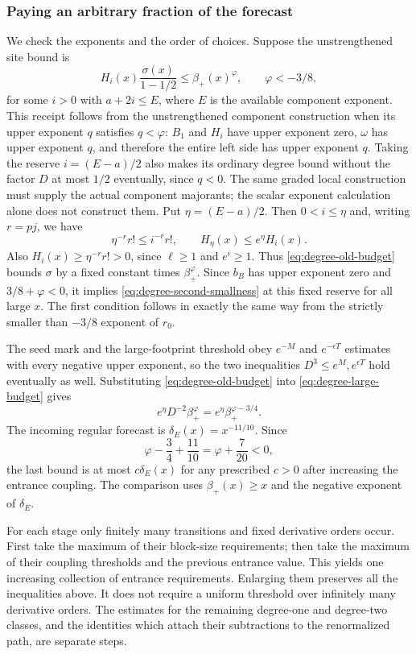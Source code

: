 \subsubsection{Paying an arbitrary fraction of the forecast}
We check the exponents and the order of choices. Suppose the
unstrengthened site bound is
\begin{equation}\label{eq:degree-old-budget}
                H_i(x)\frac{\sigma(x)}{1-1/2}
                         \le\beta_+(x)^\varphi,
                \qquad \varphi<-3/8,
\end{equation}
for some $i>0$ with $a+2i\le E$, where $E$ is the available component
exponent. This receipt follows from the unstrengthened component
construction when its upper exponent $q$ satisfies $q<\varphi$:
$B_1$ and $H_i$ have upper exponent zero, $\omega$ has upper exponent
$q$, and therefore the entire left side has upper exponent $q$.
Taking the reserve $i=(E-a)/2$ also makes its ordinary degree bound without the factor $D$
at most $1/2$ eventually, since $q<0$. The same graded local
construction must supply the actual component majorants; the scalar
exponent calculation alone does not construct them.
Put $\eta=(E-a)/2$. Then $0<i\le\eta$ and, writing
$r=pj$, we have
\[
 \eta^{-r}r!\le i^{-r}r!,\qquad
                  H_\eta(x)\le e^\eta H_i(x).
\]
Also $H_i(x)\ge\eta^{-r}r!>0$, since $\ell\ge1$ and $e^i\ge1$.
Thus \eqref{eq:degree-old-budget} bounds $\sigma$ by a fixed constant
times $\beta_+^\varphi$. Since $b_B$ has upper exponent zero and
$3/8+\varphi<0$, it implies
\eqref{eq:degree-second-smallness} at this fixed reserve for all large
$x$. The first condition follows in exactly the same way from the
strictly smaller than $-3/8$ exponent of $r_0$.

The seed mark and the large-footprint threshold obey
$e^{-M}$ and $e^{-\epsilon T}$ estimates with every negative upper
exponent, so the two inequalities $D^3\le e^M,e^{\epsilon T}$ hold
eventually as well. Substituting
\eqref{eq:degree-old-budget} into
\eqref{eq:degree-large-budget} gives
\[
 e^\eta D^{-2}\beta_+^\varphi
                        =e^\eta\beta_+^{\varphi-3/4}.
\]
The incoming regular forecast is $\delta_E(x)=x^{-11/10}$. Since
\[
             \varphi-\frac34+\frac{11}{10}
                         =\varphi+\frac7{20}<0,
\]
the last bound is at most $c\delta_E(x)$ for any prescribed $c>0$
after increasing the entrance coupling. The comparison uses
$\beta_+(x)\ge x$ and the negative exponent of $\delta_E$.

For each stage only finitely many transitions and fixed derivative
orders occur. First take the maximum of their block-size requirements;
then take the maximum of their coupling thresholds and the previous
entrance value. This yields one increasing collection of entrance
requirements. Enlarging them preserves all the inequalities above.
It does not require a uniform threshold over infinitely many derivative
orders. The estimates for the remaining degree-one and degree-two
classes, and the identities which attach their subtractions to the
renormalized path, are separate steps.
